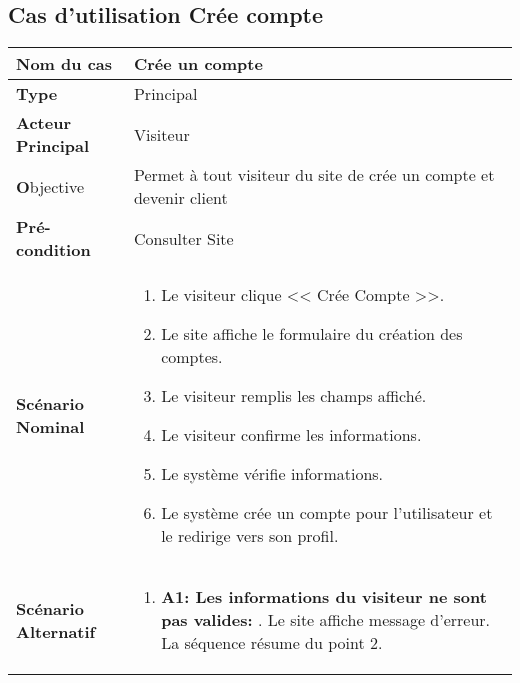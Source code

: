 \pagebreak
\subsection{Cas d'utilisation Crée compte}
\renewcommand{\arraystretch}{1.3}
\begin{center}
	\begin{table}[H]
			\centering
			\tiny\begin{tabular}{ | l | m{0.51\textheight} |}
			\hline
			\rowcolor[HTML]{06a8ed}
			\textbf{Nom du cas} & Crée un compte \\
			\hline\hline
			\cellcolor[HTML]{99ccff} \textbf{Type} & Principal\\
			\hline
			\cellcolor[HTML]{99ccff} \textbf {Acteur Principal} & Visiteur\\
			\hline
			\cellcolor[HTML]{99ccff} \textbf Objective & Permet à tout visiteur du site de	crée un compte et devenir client\\
			\hline
			\cellcolor[HTML]{99ccff}\textbf {Pré-condition} & Consulter Site\\
			\hline
			\cellcolor[HTML]{99ccff} \textbf {Scénario Nominal} & \parbox{0.43\textheight}{
					\begin{enumerate}
						\vspace{0.01\textheight}
						\item Le visiteur clique << Crée Compte >>.
						\item Le site affiche le formulaire du création des comptes.
						\item Le visiteur remplis les champs affiché.
						\item Le visiteur confirme les informations.
						\item Le système vérifie informations.
						\item Le système crée un compte pour l'utilisateur et le redirige vers son profil.
						\vspace{0.01\textheight}
					\end{enumerate}}\\
			\hline
			 \textbf {Scénario Alternatif} & \parbox{0.43\textheight}{
				\begin{enumerate}
					\item \textbf{A1: Les informations du visiteur ne sont pas valides:}
						. Le site affiche message d'erreur.\newline						
					La séquence résume du point 2.
					

\end{enumerate}}
\end{tabular}
\end{table}
\end{center}
